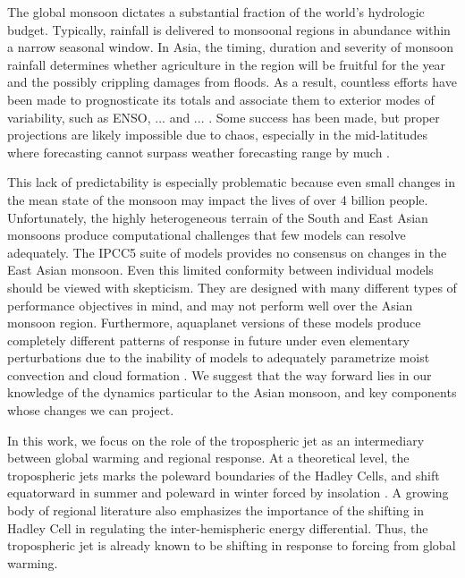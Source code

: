 
	The global monsoon dictates a substantial fraction of the world's hydrologic budget. Typically, rainfall is delivered to monsoonal regions in abundance within a narrow seasonal window. In Asia, the timing, duration and severity of monsoon rainfall determines whether agriculture in the region will be fruitful for the year and the possibly crippling damages from floods. As a result, countless efforts have been made to prognosticate its totals and associate them to exterior modes of variability, such as ENSO, ... and ... . Some success has been made, but proper projections are likely impossible due to chaos, especially in the mid-latitudes where forecasting cannot surpass weather forecasting range by much \citep{Teng2013}.
	
	This lack of predictability is especially problematic because even small changes in the mean state of the monsoon may impact the lives of over 4 billion people. Unfortunately, the highly heterogeneous terrain of the South and East Asian monsoons produce computational challenges that few models can resolve adequately. The IPCC5 suite of models provides no consensus on changes in the East Asian monsoon. Even this limited conformity between individual models should be viewed with skepticism. They are designed with many different types of performance objectives in mind, and may not perform well over the Asian monsoon region. Furthermore, aquaplanet versions of these models produce completely different patterns of response in future under even elementary perturbations due to the inability of models to adequately parametrize moist convection and cloud formation \citep{Stevens2013}. We suggest that the way forward lies in our knowledge of the dynamics particular to the Asian monsoon, and key components whose changes we can project.

	In this work, we focus on the role of the tropospheric jet as an intermediary between global warming and regional response. At a theoretical level, the tropospheric jets marks the poleward boundaries of the Hadley Cells, and shift equatorward in summer and poleward in winter forced by insolation \citep{Bordoni2008}. A growing body of regional literature also emphasizes the importance of the shifting in Hadley Cell in regulating the inter-hemispheric energy differential. Thus, the tropospheric jet is already known to be shifting in response to forcing from global warming.

